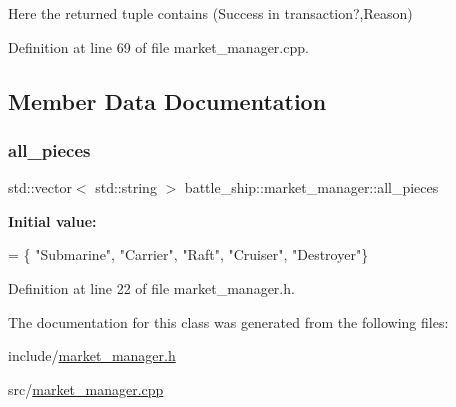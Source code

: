 Here the returned tuple contains (Success in transaction?,Reason) 



Definition at line 69 of file market\+\_\+manager.\+cpp.



\subsection{Member Data Documentation}
\mbox{\label{classbattle__ship_1_1market__manager_aa3d94799ba18b9a14edc9b2edc0ffd8d}} 
\subsubsection{\texorpdfstring{all\+\_\+pieces}{all\_pieces}}
{\footnotesize\ttfamily std\+::vector$<$ std\+::string $>$ battle\+\_\+ship\+::market\+\_\+manager\+::all\+\_\+pieces\hspace{0.3cm}{\ttfamily [static]}}

{\bfseries Initial value\+:}
\begin{DoxyCode}
= \{
    \textcolor{stringliteral}{"Submarine"}, \textcolor{stringliteral}{"Carrier"}, \textcolor{stringliteral}{"Raft"}, \textcolor{stringliteral}{"Cruiser"}, \textcolor{stringliteral}{"Destroyer"}\}
\end{DoxyCode}


Definition at line 22 of file market\+\_\+manager.\+h.



The documentation for this class was generated from the following files\+:\begin{DoxyCompactItemize}
\item 
include/\hyperlink{market__manager_8h}{market\+\_\+manager.\+h}\item 
src/\hyperlink{market__manager_8cpp}{market\+\_\+manager.\+cpp}\end{DoxyCompactItemize}
